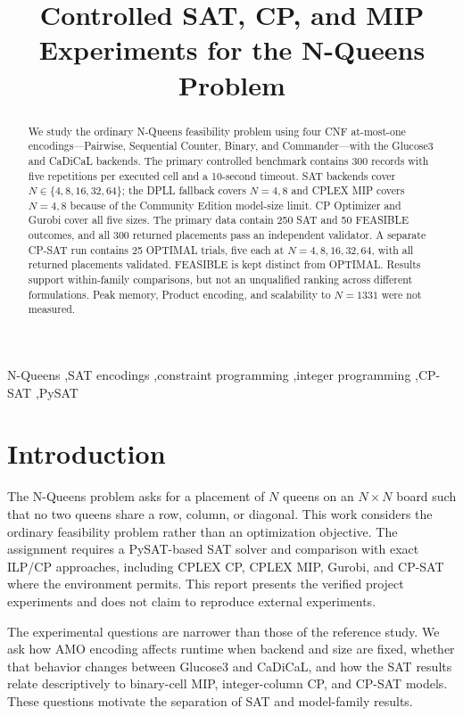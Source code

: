 \documentclass[a4paper,fleqn]{cas-sc}
\begin{document}
\RenewDocumentCommand \printorcid { } { }
\shortauthors{}
\title[mode=title]{Controlled SAT, CP, and MIP Experiments for the N-Queens Problem}
\begin{abstract}
We study the ordinary N-Queens feasibility problem using four CNF at-most-one
encodings---Pairwise, Sequential Counter, Binary, and Commander---with the
Glucose3 and CaDiCaL backends. The primary controlled benchmark contains 300
records with five repetitions per executed cell and a 10-second timeout. SAT
backends cover $N\in\{4,8,16,32,64\}$; the DPLL fallback covers $N=4,8$ and
CPLEX MIP covers $N=4,8$ because of the Community Edition model-size limit.
CP Optimizer and Gurobi cover all five sizes. The primary data contain 250 SAT
and 50 FEASIBLE outcomes, and all 300 returned placements pass an independent
validator. A separate CP-SAT run contains 25 OPTIMAL trials, five each at
$N=4,8,16,32,64$, with all returned placements validated. FEASIBLE is kept
distinct from OPTIMAL. Results support
within-family comparisons, but not an unqualified ranking across different
formulations. Peak memory, Product encoding, and scalability to $N=1331$ were
not measured.
\end{abstract}
\begin{keywords}
N-Queens \sep SAT encodings \sep constraint programming \sep integer
programming \sep CP-SAT \sep PySAT
\end{keywords}
\maketitle

\section{Introduction}
The N-Queens problem asks for a placement of $N$ queens on an $N\times N$
board such that no two queens share a row, column, or diagonal. This work
considers the ordinary feasibility problem rather than an optimization
objective. The assignment requires a PySAT-based SAT solver and comparison
with exact ILP/CP approaches, including CPLEX CP, CPLEX MIP, Gurobi, and
CP-SAT where the environment permits. This report presents the verified
project experiments and does not claim to reproduce external experiments.

The experimental questions are narrower than those of the reference study.
We ask how AMO encoding affects runtime when backend and size are fixed, whether
that behavior changes between Glucose3 and CaDiCaL, and how the SAT results
relate descriptively to binary-cell MIP, integer-column CP, and CP-SAT models.
These questions motivate the separation of SAT and model-family results.
\end{document}
